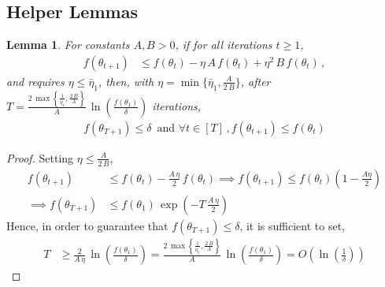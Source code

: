 \documentclass{article}
\newtheorem{lemma}{Lemma}
\newcommand{\tht}{\theta_t}
\newcommand{\thtt}{\theta_{t+1}}
\begin{document}

\subsection{Helper Lemmas}
\label{app:sd-helper-lemmas}

\begin{lemma}
For constants $A, B > 0$, if for all iterations $t \geq 1$, 
\begin{align*}
f(\thtt) & \leq f(\tht) - \eta \, A \, f(\tht) + \eta^2 \, B \, f(\tht)  \,,
\end{align*}
and requires $\eta \leq \bar{\eta}_1$, then, with $\eta = \min \{\bar{\eta}_1, \frac{A}{2 \, B} \}$, after $T = \frac{2 \, \max\left\{\frac{1}{\bar{\eta}_1}, \frac{2 \, B}{A}\right\}}{A} \, \ln \left( \frac{f(\theta_1)}{\delta} \right)$ iterations, 
\begin{align}
f(\theta_{T+1}) \leq \delta \, \text{ and } \forall t \in [T] \,, f(\thtt) \leq f(\tht)
\end{align}
\label{lemma:sd-p1}
\end{lemma}
\begin{proof}
Setting $\eta \leq \frac{A}{2 \, B}$, 
\begin{align*}
f(\thtt) & \leq f(\tht) - \frac{A \, \eta}{2} \, f(\tht) \implies f(\thtt) \leq f(\tht)\left(1-\frac{A\eta}{2}\right)\\
\implies f(\theta_{T+1}) & \leq f(\theta_1) \, \exp\left(-T \, \frac{A \, \eta}{2} \right) \tag{By recursing from $t = 1$ to $T$}
\end{align*}
Hence, in order to guarantee that $f(\theta_{T+1}) \leq \delta$, it is sufficient to set, 
\begin{align*}
T & \geq \frac{2}{A \, \eta} \, \ln \left( \frac{f(\theta_1)}{\delta} \right) = \frac{2 \, \max\left\{\frac{1}{\bar{\eta}_1}, \frac{2 \, B}{A}\right\}}{A} \, \ln \left( \frac{f(\theta_1)}{\delta} \right) = O\left(\ln\left(\frac{1}{\delta} \right)\right)
\end{align*}
\end{proof}
\end{document}
